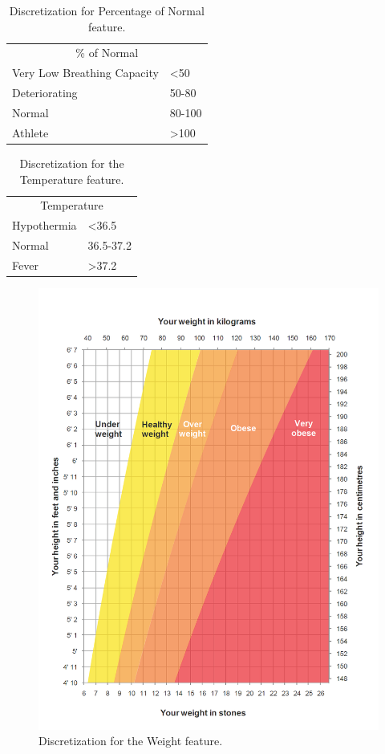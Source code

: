 \begin{table}[h]
	\begin{center}
		\begin{tabular}{ll}
			\multicolumn{2}{c}{\% of Normal}              \\
			Very Low Breathing Capacity & \textless50     \\
			Deteriorating               & 50-80           \\
			Normal                      & 80-100          \\
			Athlete                     & \textgreater100
		\end{tabular}
		\caption{Discretization for Percentage of Normal feature.}
		\label{table:percofnormal}
	\end{center}
\end{table}

\begin{table}[h]
	\begin{center}
		\begin{tabular}{ll}
			\multicolumn{2}{c}{Temperature} \\
			Hypothermia  & \textless36.5    \\
			Normal       & 36.5-37.2        \\
			Fever        & \textgreater37.2
		\end{tabular}
		\caption{Discretization for the Temperature feature.}
		\label{table:temp}
	\end{center}
\end{table}

\begin{figure}[h]
   	\centering
   	\includegraphics[width=0.49\linewidth]{Figures/adult_weight_height.png}
   	\caption{Discretization for the Weight feature.}
   	\label{fig:weight}
   \end{figure}

